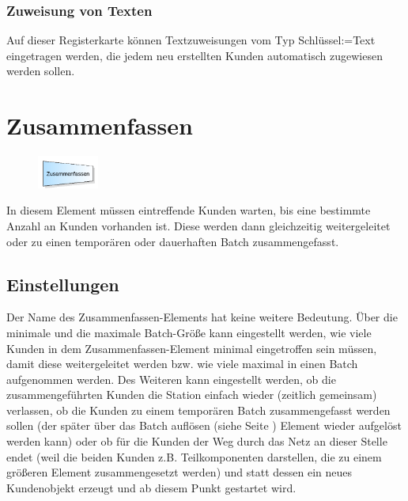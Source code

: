 \subsubsection*{Zuweisung von Texten}

Auf dieser Registerkarte können Textzuweisungen vom Typ Schlüssel:=Text eingetragen werden,
die jedem neu erstellten Kunden automatisch zugewiesen werden sollen.


\section{Zusammenfassen}
\label{ref:ModelElementBatch}

\begin{figure}
\vspace{-22pt}
\includegraphics[width=2cm]{imageModelElementBatch.png}
\vspace{-22pt}
\end{figure}

In diesem Element müssen eintreffende Kunden warten, bis eine bestimmte Anzahl an Kunden vorhanden ist.
Diese werden dann gleichzeitig weitergeleitet oder zu einen temporären oder dauerhaften Batch zusammengefasst.

\subsection*{Einstellungen}

Der Name des Zusammenfassen-Elements hat keine weitere Bedeutung. Über die minimale und die maximale Batch-Größe kann
eingestellt werden, wie viele Kunden in dem Zusammenfassen-Element minimal eingetroffen sein müssen, damit diese 
weitergeleitet werden bzw. wie viele maximal in einen Batch aufgenommen werden. Des Weiteren kann eingestellt werden,
ob die zusammengeführten Kunden die Station einfach wieder (zeitlich gemeinsam) verlassen, ob die Kunden zu einem temporären
Batch zusammengefasst werden sollen (der später über das Batch auflösen (siehe Seite \pageref{ref:ModelElementSeparate}) Element
wieder aufgelöst werden kann) oder ob für die Kunden der Weg durch
das Netz an dieser Stelle endet (weil die beiden Kunden z.B. Teilkomponenten darstellen, die zu einem größeren Element
zusammengesetzt werden) und statt dessen ein neues Kundenobjekt erzeugt und ab diesem Punkt gestartet wird.


